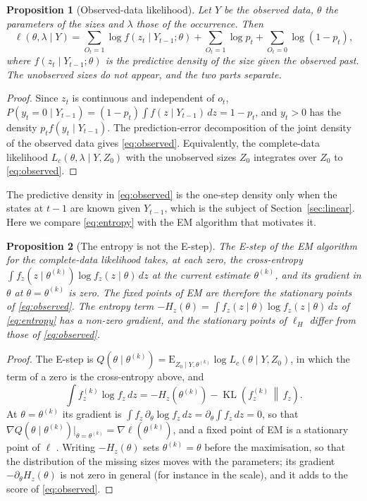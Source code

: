 \documentclass[11pt,a4paper]{article}
\newcommand{\E}{\mathrm{E}}
\DeclareMathOperator{\KL}{KL}
\newtheorem{proposition}{Proposition}
\theoremstyle{remark}
\begin{document}
\begin{proposition}[Observed-data likelihood]
\label{prop:observed}
Let $Y$ be the observed data, $\theta$ the parameters of the sizes and $\lambda$ those of the
occurrence. Then
\begin{equation}
\ell(\theta,\lambda\mid Y) = \sum_{O_t=1}\log f\!\left(z_t\mid Y_{t-1};\theta\right)
+ \sum_{O_t=1}\log p_t + \sum_{O_t=0}\log(1-p_t),
\label{eq:observed}
\end{equation}
where $f(z_t\mid Y_{t-1};\theta)$ is the predictive density of the size given the observed past.
The unobserved sizes do not appear, and the two parts separate.
\end{proposition}

\begin{proof}
Since $z_t$ is continuous and independent of $o_t$, $P(y_t = 0\mid Y_{t-1}) =
(1-p_t)\int f(z\mid Y_{t-1})\,dz = 1-p_t$, and $y_t > 0$ has the density $p_t f(y_t\mid Y_{t-1})$.
The prediction-error decomposition of the joint density of the observed data gives
\eqref{eq:observed}. Equivalently, the complete-data likelihood $L_c(\theta,\lambda\mid Y,Z_0)$ with
the unobserved sizes $Z_0$ \citep[eq.~B.3]{iETS} integrates over $Z_0$ to \eqref{eq:observed}.
\end{proof}

The predictive density in \eqref{eq:observed} is the one-step density only when the states at
$t-1$ are known given $Y_{t-1}$, which is the subject of Section~\ref{sec:linear}. Here we compare
\eqref{eq:entropy} with the EM algorithm that motivates it.

\begin{proposition}[The entropy is not the E-step]
\label{prop:em}
The E-step of the EM algorithm for the complete-data likelihood takes, at each zero, the
cross-entropy $\int f_z(z\mid\theta^{(k)})\log f_z(z\mid\theta)\,dz$ at the current estimate
$\theta^{(k)}$, and its gradient in $\theta$ at $\theta = \theta^{(k)}$ is zero. The fixed points of
EM are therefore the stationary points of \eqref{eq:observed}. The entropy term
$-H_z(\theta) = \int f_z(z\mid\theta)\log f_z(z\mid\theta)\,dz$ of \eqref{eq:entropy} has a non-zero
gradient, and the stationary points of $\ell_H$ differ from those of \eqref{eq:observed}.
\end{proposition}

\begin{proof}
The E-step is $Q(\theta\mid\theta^{(k)}) = \E_{Z_0\mid Y,\theta^{(k)}}\log L_c(\theta\mid Y,Z_0)$,
in which the term of a zero is the cross-entropy above, and
\[
\int f_z^{(k)}\log f_z\,dz = -H_z\!\left(\theta^{(k)}\right) - \KL\!\left(f_z^{(k)}\,\middle\|\,
f_z\right).
\]
At $\theta = \theta^{(k)}$ its gradient is
$\int f_z\,\partial_\theta\log f_z\,dz = \partial_\theta\int f_z\,dz = 0$, so that
$\nabla Q(\theta\mid\theta^{(k)})|_{\theta=\theta^{(k)}} = \nabla\ell(\theta^{(k)})$, and a fixed point
of EM is a stationary point of $\ell$ \citep{EM}. Writing $-H_z(\theta)$ sets $\theta^{(k)} = \theta$
before the maximisation, so that the distribution of the missing sizes moves with the parameters;
its gradient $-\partial_\theta H_z(\theta)$ is not zero in general (for instance in the scale), and it
adds to the score of \eqref{eq:observed}.
\end{proof}
\end{document}
